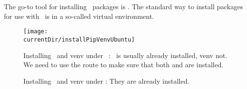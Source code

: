 %
%
%
The go-to tool for installing \python\ packages is \pip.
The standard way to install packages for use with \python\ is in a so-called virtual environment.
%
%
%
\begin{figure}%
\centering%
\texttt{[image: \\currentDir/installPipVenvUbuntu]}%
\caption{Installing \pip\ and venv under \ubuntu\ \linux: \pip~is usually already installed, venv not. %
We need to use the  route to make sure that both  and  are installed.}%
\label{fig:installPipVenvUbuntu}%
\end{figure}%
%
%
%
\endhsection%
%
%
%
\begin{figure}%
\centering%
%
\caption{Installing \pip\ and venv under \windows: They are already installed.}%
\label{fig:installPipVenvWindows}%
\end{figure}%
\endhsection%
%
\FloatBarrier%
\endhsection%
%
